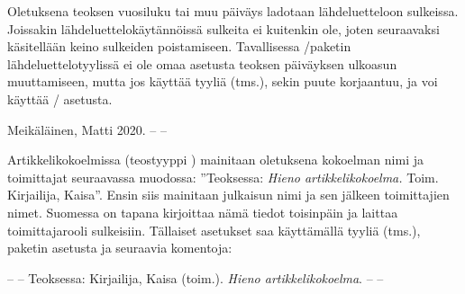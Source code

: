 \begin{koodilohkosis}
\end{koodilohkosis}

Oletuksena teoksen vuosiluku tai muu päiväys ladotaan lähdeluetteloon
sulkeissa. Joissakin lähdeluettelokäytännöissä sulkeita ei kuitenkin
ole, joten seuraavaksi käsitellään keino sulkeiden poistamiseen.
Tavallisessa \-/paketin lähdeluettelotyylissä
 ei ole omaa asetusta teoksen päiväyksen ulkoasun
muuttamiseen, mutta jos käyttää tyyliä  (tms.),
sekin puute korjaantuu, ja voi käyttää \-/
asetusta.

\begin{koodilohkosis}
\usepackage[style=ext-authoryear]{biblatex}

\end{koodilohkosis}

\begin{tulossis}
  Meikäläinen, Matti 2020. -- --
\end{tulossis}

Artikkelikokoelmissa (teostyyppi ) mainitaan
oletuksena kokoelman nimi ja toimittajat seuraavassa muodossa:
''Teoksessa: \textit{Hieno artikkelikokoelma.} Toim. Kirjailija,
Kaisa''. Ensin siis mainitaan julkaisun nimi ja sen jälkeen toimittajien
nimet. Suomessa on tapana kirjoittaa nämä tiedot toisinpäin ja laittaa
toimittajarooli sulkeisiin. Tällaiset asetukset saa käyttämällä tyyliä
 (tms.), paketin asetusta
 ja seuraavia komentoja:

\begin{koodilohkosis}
\usepackage[style=ext-authoryear, innamebeforetitle=true]{biblatex}

\end{koodilohkosis}

\begin{tulossis}
  -- -- Teoksessa: Kirjailija, Kaisa (toim.). \textit{Hieno
    artikkelikokoelma}. -- --
\end{tulossis}

